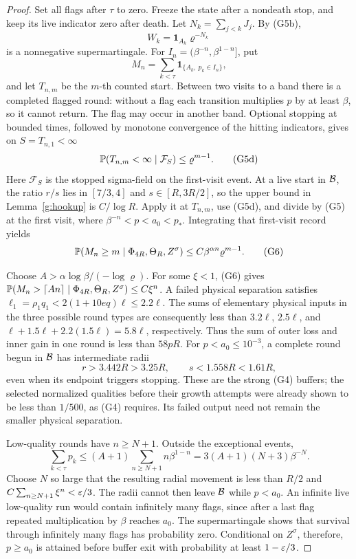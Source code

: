 \begin{proof}
Set all flags after \(\tau\) to zero.  Freeze the state after a nondeath
stop, and keep its live indicator zero after death.  Let
\(N_k=\sum_{j<k}J_j\).  By (G5b),
\[
                  W_k=\mathbf1_{A_k}\varrho^{-N_k}
\]
is a nonnegative supermartingale.  For
\(I_n=(\beta^{-n},\beta^{1-n}]\), put
\[
 M_n=\sum_{k<\tau}\mathbf1_{\{A_k,\ p_k\in I_n\}},
\]
and let \(T_{n,m}\) be the \(m\)-th counted start.  Between two visits
to a band there is a completed flagged round: without a flag each
transition multiplies \(p\) by at least \(\beta\), so it cannot return.
The flag may occur in another band.  Optional stopping at bounded times,
followed by monotone convergence of the hitting indicators, gives on
\(S=T_{n,1}<\infty\)
\[
 \mathbb P(T_{n,m}<\infty\mid\mathcal F_S)\le\varrho^{m-1}.    \tag{G5d}
\]
Here \(\mathcal F_S\) is the stopped sigma-field on the first-visit event.
At a live start in \({\cal B}\), the ratio \(r/s\) lies in \([7/3,4]\)
and \(s\in[R,3R/2]\), so the upper bound in Lemma~\ref{g:hookup} is
\(C/\log R\).  Apply it at \(T_{n,m}\), use (G5d), and divide by (G5)
at the first visit, where \(\beta^{-n}<p<a_0<p_*\).  Integrating that first-visit
record yields
\[
 \mathbb P(M_n\ge m\mid\Phi_{4R},\Theta_R,Z^\sigma)
       \le C\beta^{\alpha n}\varrho^{m-1}.                 \tag{G6}
\]

Choose \(A>\alpha\log\beta/(-\log\varrho)\).  For some \(\xi<1\),
(G6) gives
\(\mathbb P(M_n>\lceil An\rceil\mid\Phi_{4R},\Theta_R,Z^\sigma)
\le C\xi^n\).  A failed physical separation satisfies
\(\ell_1=\rho_1q_1<2(1+10eq)\ell\le2.2\ell\).  The sums of elementary
physical inputs in the three possible round types are consequently less
than \(3.2\ell\), \(2.5\ell\), and
\(\ell+1.5\ell+2.2(1.5\ell)=5.8\ell\), respectively.  Thus the sum of
outer loss and inner gain in one round is less than \(58pR\).
For \(p<a_0\le10^{-3}\), a complete round begun in \({\cal B}\) has
intermediate radii
\[
 r>3.442R>3.25R,\qquad s<1.558R<1.61R,
\]
even when its endpoint triggers stopping.  These are the strong (G4)
buffers; the selected normalized qualities before their growth attempts
were already shown to be less than \(1/500\), as (G4) requires.  Its failed
output need not remain the smaller physical separation.

Low-quality rounds have \(n\ge N+1\).  Outside the exceptional events,
\[
 \sum_{k<\tau}p_k
 \le (A+1)\sum_{n\ge N+1}n\beta^{1-n}
 =3(A+1)(N+3)\beta^{-N}.
\]
Choose \(N\) so large that the resulting radial movement is less than
\(R/2\) and \(C\sum_{n\ge N+1}\xi^n<\varepsilon/3\).  The radii cannot then
leave \({\cal B}\) while \(p<a_0\).  An infinite live
low-quality run would contain infinitely many flags, since after a last
flag repeated multiplication by \(\beta\) reaches \(a_0\).  The
supermartingale shows that survival through infinitely many flags has
probability zero.  Conditional on \(Z^\sigma\), therefore, \(p\ge a_0\)
is attained before buffer exit with probability at least \(1-\varepsilon/3\).


\end{proof}
